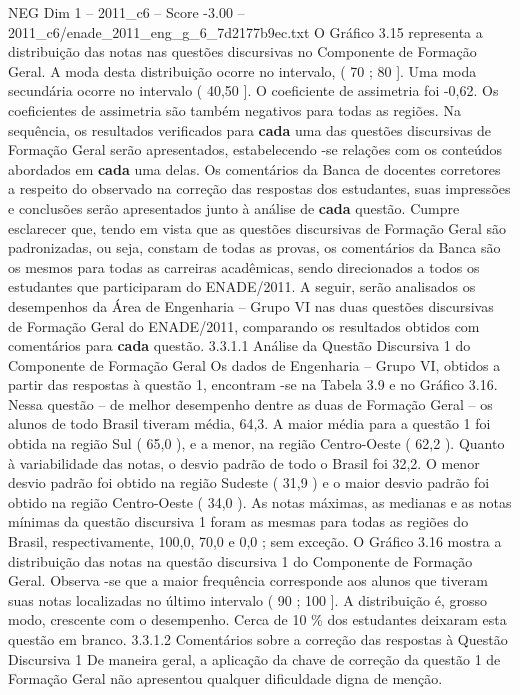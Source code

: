 \begin{textsample}{NEG Dim 1 – 2011\_c6 – Score -3.00 – 2011\_c6/enade\_2011\_eng\_g\_6\_7d2177b9ec.txt}
O Gráfico 3.15 representa a distribuição das notas nas questões discursivas no Componente de Formação Geral.
A moda desta distribuição ocorre no intervalo, ( 70 ; 80 ].
Uma moda secundária ocorre no intervalo ( 40,50 ].
O coeficiente de assimetria foi -0,62.
Os coeficientes de assimetria são também negativos para todas as regiões.
Na sequência, os resultados verificados para \textbf{cada} uma das questões discursivas de Formação Geral serão apresentados, estabelecendo -se relações com os conteúdos abordados em \textbf{cada} uma delas.
Os comentários da Banca de docentes corretores a respeito do observado na correção das respostas dos estudantes, suas impressões e conclusões serão apresentados junto à análise de \textbf{cada} questão.
Cumpre esclarecer que, tendo em vista que as questões discursivas de Formação Geral são padronizadas, ou seja, constam de todas as provas, os comentários da Banca são os mesmos para todas as carreiras acadêmicas, sendo direcionados a todos os estudantes que participaram do ENADE/2011.
A seguir, serão analisados os desempenhos da Área de Engenharia – Grupo VI nas duas questões discursivas de Formação Geral do ENADE/2011, comparando os resultados obtidos com comentários para \textbf{cada} questão. 3.3.1.1 Análise da Questão Discursiva 1 do Componente de Formação Geral Os dados de Engenharia – Grupo VI, obtidos a partir das respostas à questão 1, encontram -se na Tabela 3.9 e no Gráfico 3.16.
Nessa questão – de melhor desempenho dentre as duas de Formação Geral – os alunos de todo Brasil tiveram média, 64,3.
A maior média para a questão 1 foi obtida na região Sul ( 65,0 ), e a menor, na região Centro-Oeste ( 62,2 ).
Quanto à variabilidade das notas, o desvio padrão de todo o Brasil foi 32,2.
O menor desvio padrão foi obtido na região Sudeste ( 31,9 ) e o maior desvio padrão foi obtido na região Centro-Oeste ( 34,0 ).
As notas máximas, as medianas e as notas mínimas da questão discursiva 1 foram as mesmas para todas as regiões do Brasil, respectivamente, 100,0, 70,0 e 0,0 ; sem exceção.
O Gráfico 3.16 mostra a distribuição das notas na questão discursiva 1 do Componente de Formação Geral.
Observa -se que a maior frequência corresponde aos alunos que tiveram suas notas localizadas no último intervalo ( 90 ; 100 ].
A distribuição é, grosso modo, crescente com o desempenho.
Cerca de 10 \% dos estudantes deixaram esta questão em branco. 3.3.1.2 Comentários sobre a correção das respostas à Questão Discursiva 1 De maneira geral, a aplicação da chave de correção da questão 1 de Formação Geral não apresentou qualquer dificuldade digna de menção.

\end{textsample}
